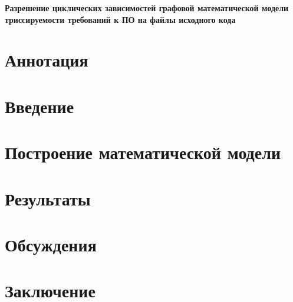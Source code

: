 \documentclass{article}
\begin{document}
    \begin{center}
    \large
    \textbf{Разрешение циклических зависимостей графовой математической модели триссируемости требований к ПО на файлы исходного кода}



    \end{center}

    \tableofcontents
    \newpage

    \section{Аннотация}
    

    \section{Введение}
    

    \section{Построение математической модели}
    

    \section{Результаты}
    

    \section{Обсуждения}
    

    \section{Заключение}
    
\end{document}
